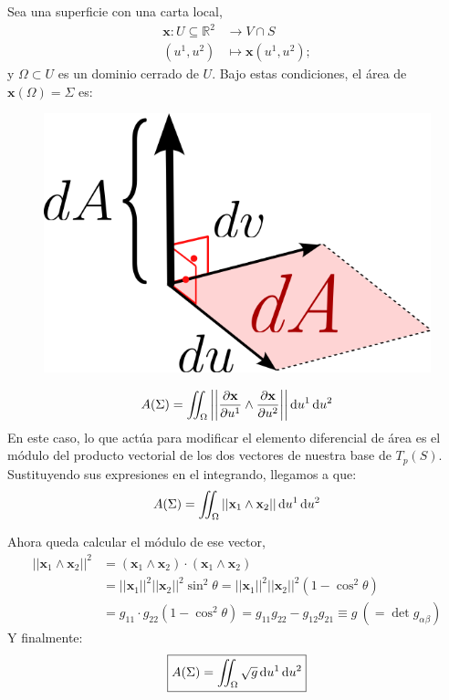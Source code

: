 Sea una superficie con una carta local,
\begin{align*}
    \mathbf{x}:U\subseteq\mathbb{R}^2&\longrightarrow V \cap S\\
                        (u^1,u^2)&\longmapsto \mathbf{x}(u^1,u^2);
\end{align*}
y $\Omega \subset U$ es un dominio cerrado de $U$. Bajo estas condiciones, el área de $\mathbf{x}(\Omega)=\Sigma$ es:\\
\begin{figure}
    \centering
    \includegraphics[scale=.3]{FOTOS/jacobiano.png}
\end{figure}
$$
A(\Sigma)=\int \!\!\!\!\int _\Omega \left | \left | \pdv{\mathbf{x}}{u^1}\wedge \pdv{\mathbf{x}}{u^2} \right | \right |\odif{u^1}\odif{u^2}
$$
En este caso, lo que actúa para modificar el elemento diferencial de área es el módulo del producto vectorial de los dos vectores de nuestra base de $T_p(S)$. Sustituyendo sus expresiones en el integrando, llegamos a que:
$$
A(\Sigma)=\int \!\!\!\!\int _\Omega ||\mathbf{x}_1\wedge \mathbf{x}_2||\odif{u^1}\odif{u^2}
$$

Ahora queda calcular el módulo de ese vector,
\begin{equation*}
    \begin{split}
        ||\mathbf{x}_1\wedge \mathbf{x}_2||^2&=(\mathbf{x}_1\wedge \mathbf{x}_2)\cdot (\mathbf{x}_1\wedge \mathbf{x}_2)\\
                                     &=||\mathbf{x}_1||^2||\mathbf{x}_2||^2 \sin ^2 \theta = ||\mathbf{x}_1||^2 ||\mathbf{x}_2||^2 (1-\cos ^2 \theta)\\
                                     &=g_{11}\cdot g_{22}(1-\cos ^2 \theta)=g_{11}g_{22}-g_{12}g_{21}\equiv g \ \left (=\det{g_{\alpha\beta}}\right )
    \end{split}
\end{equation*}
Y finalmente:
$$
\boxed{A(\Sigma)=\int \!\!\!\!\int _\Omega \sqrt{g}\odif{u^1}\odif{u^2}}
$$
